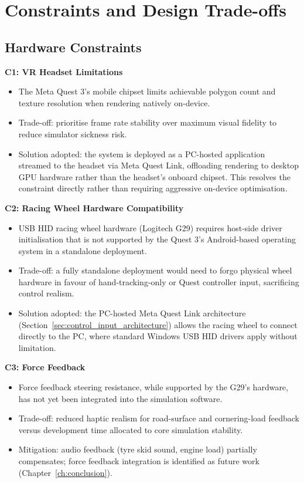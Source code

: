 \section{Constraints and Design Trade-offs}

\subsection{Hardware Constraints}
\textbf{C1: VR Headset Limitations}
\begin{itemize}
    \item The Meta Quest 3's mobile chipset limits achievable polygon count and texture resolution when rendering natively on-device.
    \item Trade-off: prioritise frame rate stability over maximum visual fidelity to reduce simulator sickness risk.
    \item Solution adopted: the system is deployed as a PC-hosted application streamed to the headset via Meta Quest Link, offloading rendering to desktop GPU hardware rather than the headset's onboard chipset. This resolves the constraint directly rather than requiring aggressive on-device optimisation.
\end{itemize}

\textbf{C2: Racing Wheel Hardware Compatibility}
\begin{itemize}
    \item USB HID racing wheel hardware (Logitech G29) requires host-side driver initialisation that is not supported by the Quest 3's Android-based operating system in a standalone deployment.
    \item Trade-off: a fully standalone deployment would need to forgo physical wheel hardware in favour of hand-tracking-only or Quest controller input, sacrificing control realism.
    \item Solution adopted: the PC-hosted Meta Quest Link architecture (Section~\ref{sec:control_input_architecture}) allows the racing wheel to connect directly to the PC, where standard Windows USB HID drivers apply without limitation.
\end{itemize}

\textbf{C3: Force Feedback}
\begin{itemize}
    \item Force feedback steering resistance, while supported by the G29's hardware, has not yet been integrated into the simulation software.
    \item Trade-off: reduced haptic realism for road-surface and cornering-load feedback versus development time allocated to core simulation stability.
    \item Mitigation: audio feedback (tyre skid sound, engine load) partially compensates; force feedback integration is identified as future work (Chapter~\ref{ch:conclusion}).
\end{itemize}

